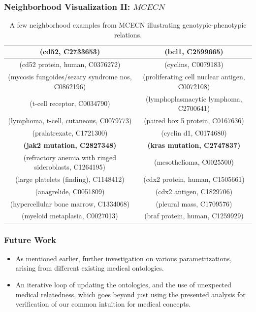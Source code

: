 \documentclass{beamer}
\newcommand\T{\rule{0pt}{2.6ex}}       %
\newcommand\B{\rule[-1.2ex]{0pt}{0pt}} %
\begin{document}
\begin{frame}
\frametitle{Neighborhood Visualization II: $MCECN$}
\begin{table}[t]
\caption{\centering \scriptsize
 A few neighborhood
  examples from MCECN illustrating genotypic-phenotypic relations.\label{table:genotype-examples}}
{ \tiny
\begin{center}
\begin{tabular}{|c|c|} 
\hline
 {\bf (cd52, C2733653)} &  {\bf (bcl1, C2599665)} \T \B \\ 
\hline
(cd52 protein, human, C0376272) &  (cyclins, C0079183) \T \\
(mycosis fungoides/sezary syndrome nos, C0862196) &   (proliferating cell nuclear antigen, C0072108) \T \\
(t-cell receptor, C0034790) &  (lymphoplasmacytic lymphoma, C2700641) \T \\
 (lymphoma, t-cell, cutaneous, C0079773) & (paired box 5 protein, C0167636) \T \\
 (pralatrexate, C1721300) &   (cyclin d1, C0174680) \T \\
\hline
{\bf (jak2 mutation, C2827348)} & {\bf (kras mutation, C2747837) }  \T \B \\
\hline
 (refractory anemia with ringed sideroblasts, C1264195) & (mesothelioma, C0025500) \T \\
(large platelets (finding), C1148412) &  (cdx2 protein, human, C1505661) \T \\
 (anagrelide, C0051809) &  (cdx2 antigen, C1829706) \T \\
 (hypercellular bone marrow, C1334068)  & (pleural mass, C1709576) \T \\
 (myeloid metaplasia, C0027013) & (braf protein, human, C1259929) \T \\
\hline
\end{tabular}
\end{center}
}
\end{table}
\end{frame}

\begin{frame}
\frametitle{Future Work}
\begin{itemize}
\item As mentioned earlier, further investigation
on various 
parametrizations, arising from different existing
medical ontologies.

\bigskip

\item An iterative loop of updating the ontologies,
and the use of unexpected medical relatedness,
which goes beyond just using the presented analysis
for verification of our common intuition for
medical concepts.

\end{itemize}
\end{frame}
\end{document}
